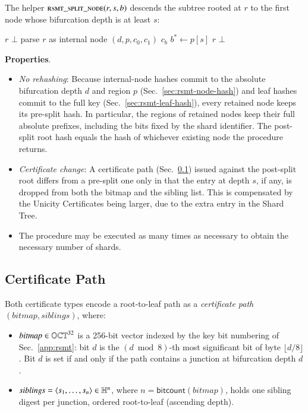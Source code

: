 The helper $\textsc{rsmt\_split\_node}(r, s, b)$ descends the subtree rooted at $r$ to the first node whose bifurcation depth is at least $s$:

\begin{algorithmic}
			 \Return $r$
			\Else
				\State \Return $\bot$
			\EndIf
		\EndIf
		\State parse $r$ as internal node $(d, p, c_0, c_1)$
			\State \Return $c_b$ 
		\Else {}
			\State $b^* \gets p[s]$ 
				\State \Return $r$
			\Else
				\State \Return $\bot$
			\EndIf
		\EndIf
	\EndFunction
\end{algorithmic}

\textbf{Properties}.
\begin{itemize}
	\item \emph{No rehashing}: Because internal-node hashes commit to the absolute bifurcation depth $d$ and region $p$ (Sec.~\ref{sec:rsmt-node-hash}) and leaf hashes commit to the full key (Sec.~\ref{sec:rsmt-leaf-hash}), every retained node keeps its pre-split hash. In particular, the regions of retained nodes keep their full absolute prefixes, including the bits fixed by the shard identifier. The post-split root hash equals the hash of whichever existing node the procedure returns.
	\item \emph{Certificate change}: A certificate path (Sec.~\ref{sec:rsmt-cert-path}) issued against the post-split root differs from a pre-split one only in that the entry at depth $s$, if any, is dropped from both the bitmap and the sibling list. This is compensated by the Unicity Certificates being larger, due to the extra entry in the Shard Tree.
	\item The procedure may be executed as many times as necessary to obtain the necessary number of shards.
\end{itemize}

\subsection{Certificate Path}\label{sec:rsmt-cert-path}

Both certificate types encode a root-to-leaf path as a \emph{certificate path} $(\mathit{bitmap},\mathit{siblings})$, where:
\begin{itemize}
	\item $\mathit{bitmap} \in \mathbb{OCT}^{32}$ is a 256-bit vector indexed by the key bit numbering of Sec.~\ref{app:rsmt}: bit $d$ is the $(d \bmod 8)$-th most significant bit of byte $\lfloor d/8 \rfloor$. Bit $d$ is set if and only if the path contains a junction at bifurcation depth $d$.
	\item $\mathit{siblings}=\langle s_1,\ldots,s_n\rangle\in\mathbb{H}^n$, where $n=\mathsf{bitcount}(\mathit{bitmap})$, holds one sibling digest per junction, ordered root-to-leaf (ascending depth).
\end{itemize}

